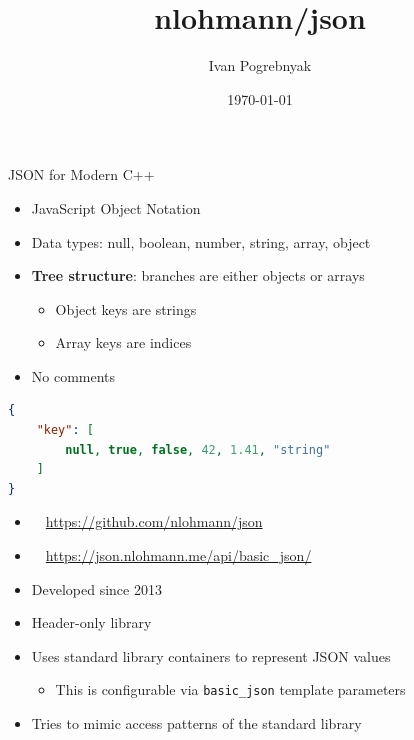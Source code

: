 \documentclass{slides}
\title{\texorpdfstring{\ttfamily nlohmann/json}{nlohmann/json}}
\author{Ivan Pogrebnyak}
\date{\today}
\makeatletter
\newcommand{\@slidetitle}{}
\newcommand{\slidetitle}[1]{\renewcommand{\@slidetitle}{#1}}
\makeatother
\begin{document}
\thispagestyle{empty}
\makeatletter
{\centering \huge \color{araBlue} \@title \par}
{\centering \Large \color{araBlue2} {JSON for Modern C++} \par}
{\centering \Large \@author \par}
{\centering \@date \par}
\makeatother
\break
\pagestyle{fancy}

\slidetitle{JSON}

\begin{itemize}
\item JavaScript Object Notation
\item Data types:
  null, boolean, number, string, array, object
\item {\bfseries Tree structure}: branches are either objects or arrays
  \begin{itemize}
    \item Object keys are strings
    \item Array keys are indices
  \end{itemize}
\item No comments
\end{itemize}

\vspace{1em}
\begin{lstlisting}[language=json]
{
    "key": [
        null, true, false, 42, 1.41, "string"
    ]
}
\end{lstlisting}

\break
\slidetitle{\ttfamily nlohmann/json}

\begin{itemize}
  \item \faFileTextO\ \ \url{https://github.com/nlohmann/json}
  \item \faGithub\ \ \url{https://json.nlohmann.me/api/basic_json/}
  \item Developed since 2013
  \item Header-only library
  \item Uses standard library containers to represent JSON values
  \begin{itemize}
    \item This is configurable via \lstinline{basic_json} template parameters
  \end{itemize}
  \item Tries to mimic access patterns of the standard library
\end{itemize}
\end{document}
